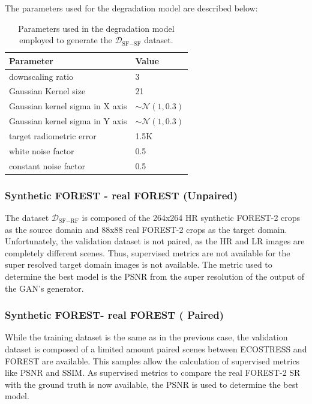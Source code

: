    The parameters used for the degradation model are described below:

    \begin{table}[H]
        \centering
        \begin{tabular}{l|l}
        Parameter & Value \\ \hline
        downscaling ratio & 3 \\ 
        Gaussian Kernel size & 21 \\ 
        Gaussian kernel sigma in X axis &  $\sim \mathcal{N}(1,0.3)$  \\ 
        Gaussian kernel sigma in Y axis &  $\sim \mathcal{N}(1,0.3)$  \\ 
        target radiometric error & 1.5K \\ 
        white noise factor & 0.5 \\ 
        constant noise factor & 0.5 \\ 
        \end{tabular}
        \caption{Parameters used in the degradation model employed to generate the $\mathcal{D}_{\text{SF}-\text{SF}}$ dataset.}
        \label{tab:degradation_model_parameters}
    \end{table}

\subsubsection{Synthetic FOREST - real FOREST (Unpaired)}
    The dataset $\mathcal{D}_{\text{SF}-\text{RF}}$ is composed of the 264x264 HR synthetic FOREST-2 crops as the source domain and  88x88 real FOREST-2 crops as the target domain. 
    Unfortunately, the validation dataset is not paired, as the HR and LR images are completely different scenes.
    Thus, supervised metrics are not available for the super resolved target domain images is not available. 
    The metric used to determine the best model is the PSNR from the super resolution of the output of the GAN's generator.

\subsubsection{Synthetic FOREST- real FOREST ( Paired)}
    While the training dataset is the same as in the previous case, the validation dataset is composed of a limited amount paired scenes between ECOSTRESS and FOREST are available.
    This samples allow the calculation of supervised metrics like PSNR and SSIM. 
    As supervised metrics to compare the real FOREST-2 SR with the ground truth is now available, the PSNR is used to determine the best model.




\newpage
